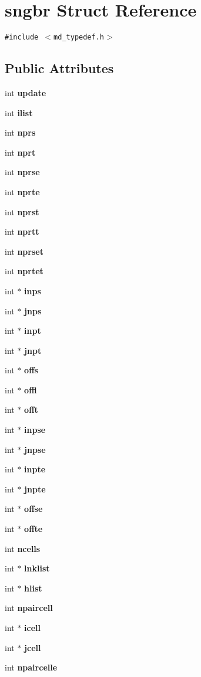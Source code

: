 \section{sngbr Struct Reference}
\label{structsngbr}
{\tt \#include $<$md\_\-typedef.h$>$}

\subsection*{Public Attributes}
\begin{CompactItemize}
\item 
int {\bf update}
\item 
int {\bf ilist}
\item 
int {\bf nprs}
\item 
int {\bf nprt}
\item 
int {\bf nprse}
\item 
int {\bf nprte}
\item 
int {\bf nprst}
\item 
int {\bf nprtt}
\item 
int {\bf nprset}
\item 
int {\bf nprtet}
\item 
int $\ast$ {\bf inps}
\item 
int $\ast$ {\bf jnps}
\item 
int $\ast$ {\bf inpt}
\item 
int $\ast$ {\bf jnpt}
\item 
int $\ast$ {\bf offs}
\item 
int $\ast$ {\bf offl}
\item 
int $\ast$ {\bf offt}
\item 
int $\ast$ {\bf inpse}
\item 
int $\ast$ {\bf jnpse}
\item 
int $\ast$ {\bf inpte}
\item 
int $\ast$ {\bf jnpte}
\item 
int $\ast$ {\bf offse}
\item 
int $\ast$ {\bf offte}
\item 
int {\bf ncells}
\item 
int $\ast$ {\bf lnklist}
\item 
int $\ast$ {\bf hlist}
\item 
int {\bf npaircell}
\item 
int $\ast$ {\bf icell}
\item 
int $\ast$ {\bf jcell}
\item 
int {\bf npaircelle}
\item 

\end{CompactItemize}
